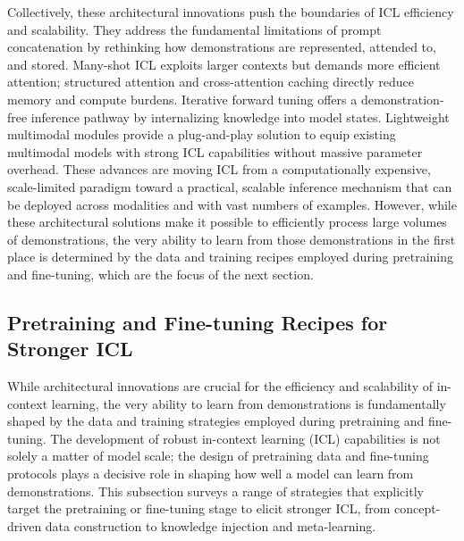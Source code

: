 \documentclass[11pt]{article}
\begin{document}
Collectively, these architectural innovations push the boundaries of ICL efficiency and scalability. They address the fundamental limitations of prompt concatenation by rethinking how demonstrations are represented, attended to, and stored. Many-shot ICL exploits larger contexts but demands more efficient attention; structured attention and cross-attention caching directly reduce memory and compute burdens. Iterative forward tuning offers a demonstration-free inference pathway by internalizing knowledge into model states. Lightweight multimodal modules provide a plug-and-play solution to equip existing multimodal models with strong ICL capabilities without massive parameter overhead. These advances are moving ICL from a computationally expensive, scale-limited paradigm toward a practical, scalable inference mechanism that can be deployed across modalities and with vast numbers of examples. However, while these architectural solutions make it possible to efficiently process large volumes of demonstrations, the very ability to learn from those demonstrations in the first place is determined by the data and training recipes employed during pretraining and fine-tuning, which are the focus of the next section.

\subsection{Pretraining and Fine-tuning Recipes for Stronger ICL}

While architectural innovations are crucial for the efficiency and scalability of in-context learning, the very ability to learn from demonstrations is fundamentally shaped by the data and training strategies employed during pretraining and fine-tuning. The development of robust in-context learning (ICL) capabilities is not solely a matter of model scale; the design of pretraining data and fine-tuning protocols plays a decisive role in shaping how well a model can learn from demonstrations. This subsection surveys a range of strategies that explicitly target the pretraining or fine-tuning stage to elicit stronger ICL, from concept-driven data construction to knowledge injection and meta-learning.
\end{document}
